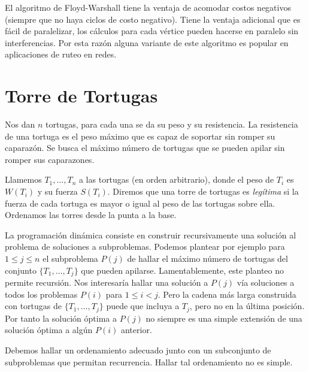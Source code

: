   El algoritmo de Floyd-Warshall tiene la ventaja de acomodar costos negativos
  (siempre que no haya ciclos de costo negativo).
  Tiene la ventaja adicional que es fácil de paralelizar,
  los cálculos para cada vértice
  pueden hacerse en paralelo sin interferencias.
  Por esta razón alguna variante de este algoritmo
  es popular en aplicaciones de ruteo en redes.

\section{Torre de Tortugas}
\label{sec:torre-de-tortugas}

  Nos dan \(n\) tortugas,
  para cada una se da su peso y su resistencia.
  La resistencia de una tortuga es el peso máximo
  que es capaz de soportar sin romper su caparazón.
  Se busca el máximo número de tortugas que se pueden apilar
  sin romper sus caparazones.

  Llamemos \(T_1, \dotsc, T_n\) a las tortugas
  (en orden arbitrario),
  donde el peso de \(T_i\) es \(W(T_i)\) y su fuerza \(S(T_i)\).
  Diremos que  una torre de tortugas es \emph{legítima}
  si la fuerza de cada tortuga es mayor o igual
  al peso de las tortugas sobre ella.
  Ordenamos las torres desde la punta a la base.

  La programación dinámica
  consiste en construir recursivamente una solución al problema
  de soluciones a subproblemas.
  Podemos plantear por ejemplo para \(1 \le j \le n\)
  el subproblema \(P(j)\) de hallar el máximo número de tortugas
  del conjunto \(\{ T_1, \dotsc, T_j \}\) que pueden apilarse.
  Lamentablemente,
  este planteo no permite recursión.
  Nos interesaría hallar una solución a \(P(j)\)
  vía soluciones a todos los problemas \(P(i)\) para \(1 \le i < j\).
  Pero la cadena más larga construida
  con tortugas de \(\{ T_1, \dotsc, T_j \}\)
  puede que incluya a \(T_j\),
  pero no en la última posición.
  Por tanto la solución óptima a \(P(j)\)
  no siempre es una simple extensión de una solución óptima
  a algún \(P(i)\) anterior.

  Debemos hallar un ordenamiento adecuado
  junto con un subconjunto de subproblemas que permitan recurrencia.
  Hallar tal ordenamiento no es simple.


